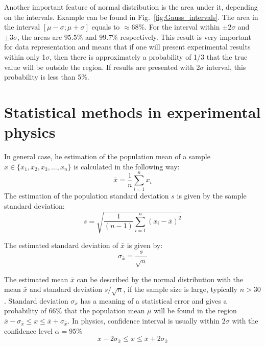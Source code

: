 \documentclass[12pt,a4paper]{report}
\begin{document}
Another important feature of normal distribution is the area under it, depending on the intervals. Example can be found in Fig.~\ref{fig:Gauss_intervals}. The area in the interval $[\mu-\sigma;\mu+\sigma]$ equals to $\approx 68\%$. For the interval within $\pm 2\sigma$ and $\pm 3\sigma$, the areas are $95.5\%$ and $99.7\%$ respectively. This result is very important for data representation and means that if one will present experimental results within only 1$\sigma$, then there is approximately a probability of 1/3 that the true value will be outside the region. If results are presented with 2$\sigma$ interval, this probability is less than 5\%.



\section{Statistical methods in experimental physics} \label{methods}

In general case, he estimation of the population mean of a sample $x \in \{ x_1, x_2, x_3, \dots , x_n \}$ is calculated in the following way:
\begin{equation} \label{av_value}
\bar{x} = \frac{1}{n} \sum_{i = 1}^{n} {x_i}
\end{equation}
The estimation of the population standard deviation $s$ is given by the sample standard deviation:
\begin{equation} \label{sample_standard_dev}
s = \sqrt{\frac{1}{(n-1)} \sum_{i = 1}^{n} {(x_i - \bar{x})^2}}
\end{equation}

The estimated standard deviation of $\bar{x}$ is given by:
\begin{equation} \label{standart_dev}
\sigma_{\bar{x}} = \frac{s}{ \sqrt{n} }
\end{equation}

The estimated mean $\bar{x}$ can be described by the normal distribution with the mean $\bar{x}$ and standard deviation $s / \sqrt{n}$, if the sample size is large, typically $n>30$.
Standard deviation $\sigma_{\bar{x}}$ has a meaning of a statistical error and gives a probability of 66$\%$ that the population mean $\mu$ will be found in the region $\bar{x} - \sigma_{\bar{x}} \le x \le \bar{x} + \sigma_{\bar{x}}$. In physics, confidence interval is usually within $2 \sigma$ with the confidence level $\alpha = 95 \%$
\begin{equation} \label{confidence_interval_large}
\bar{x} - 2 \sigma_{\bar{x}} \le x \le \bar{x} + 2 \sigma_{\bar{x}}
\end{equation}
\end{document}
